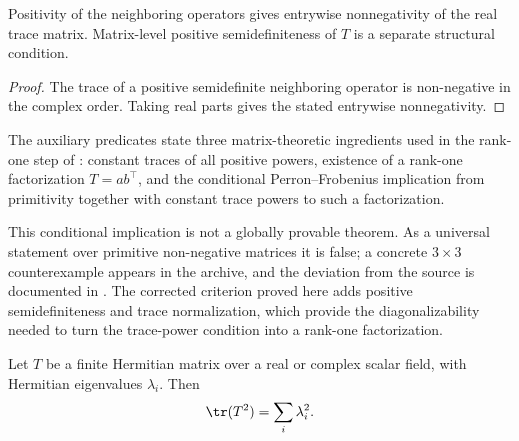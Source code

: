 \begin{theorem}
    \label{thm:mpdo_explicit_eta_trace_matrix_nonneg}
    \leanok
    Positivity of the neighboring operators gives entrywise nonnegativity of
    the real trace matrix. Matrix-level positive semidefiniteness of $T$ is a
    separate structural condition.
\end{theorem}

\begin{proof}
    \leanok
    The trace of a positive semidefinite neighboring operator is non-negative in
    the complex order. Taking real parts gives the stated entrywise
    nonnegativity.
\end{proof}

\begin{definition}
    \label{def:matrix_trace_rankone_predicates}
    \leanok
    The auxiliary predicates state three matrix-theoretic ingredients used in
    the rank-one step of \cite[Appendix~C.2, Lemma~C.5]{Cirac2016MPDO_arXiv}:
    constant traces of all
    positive powers, existence of a rank-one factorization $T = a b^\top$, and
    the conditional Perron--Frobenius implication from primitivity together with
    constant trace powers to such a factorization.

    This conditional implication is not a globally provable theorem. As a
    universal statement over primitive non-negative matrices it is false; a
    concrete $3 \times 3$ counterexample appears in the archive, and the
    deviation from the source is documented in
    . The
    corrected criterion proved here adds positive semidefiniteness and trace
    normalization, which provide the diagonalizability needed to turn the
    trace-power condition into a rank-one factorization.
\end{definition}

\begin{theorem}
    \label{thm:matrix_hermitian_trace_square_eigenvalues}
    \leanok
    Let $T$ be a finite Hermitian matrix over a real or complex scalar field,
    with Hermitian eigenvalues $\lambda_i$. Then
    \[
        \tr(T^2) = \sum_i \lambda_i^2.
    \]
\end{theorem}

